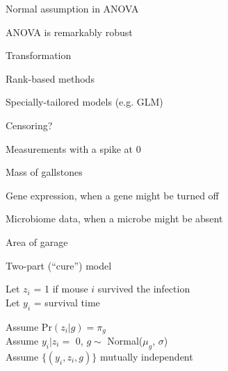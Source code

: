\documentclass[aspectratio=169,12pt,t]{beamer}
\begin{document}
\begin{frame}{Normal assumption in ANOVA}

  \bbi
\item ANOVA is remarkably robust
\item Transformation
\item Rank-based methods
\item Specially-tailored models (e.g. GLM)
  \ei


\note{
}

\end{frame}




\begin{frame}[c]{}

\centerline{\Large \color{title} Censoring?}


\note{
}

\end{frame}


\begin{frame}{Measurements with a spike at 0}

\bbi
\item Mass of gallstones

\item Gene expression, when a gene might be turned off

\item Microbiome data, when a microbe might be absent

\item Area of garage
\ei


\note{
}

\end{frame}





\begin{frame}{Two-part (``cure'') model}

  \bbi
  \itemsep24pt

  \item Let $z_i$ = 1 if mouse $i$ survived the infection \\[12pt]

  {\color{background} Let} $y_i$ = survival time

\item Assume $\text{Pr}(z_i|g) = \pi_g$ \\[12pt]

  {\color{background} Assume} $y_i | z_i=$ 0, $g \sim$ Normal($\mu_g$,
  $\sigma$) \\[12pt]

  {\color{background} Assume} $\{(y_i, z_i, g)\}$ mutually independent

  \ei


\note{
}

\end{frame}
\end{document}
